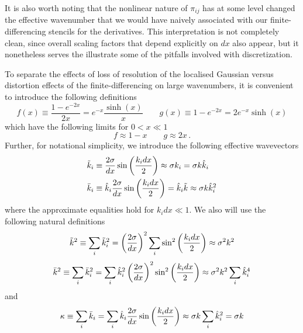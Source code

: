 \documentclass{revtex4}
\begin{document}
It is also worth noting that the nonlinear nature of $\pi_{ij}$ has at some level changed the effective wavenumber that we would have naively associated with our finite-differencing stencils for the derivatives.  This interpretation is not completely clean, since overall scaling factors that depend explicitly on $dx$ also appear, but it nonetheless serves the illustrate some of the pitfalls involved with discretization.

To separate the effects of loss of resolution of the localised Gaussian versus distortion effects of the finite-differencing on large wavenumbers, it is convenient to introduce the following definitions
\begin{equation}
  f(x) \equiv \frac{1-e^{-2x}}{2x} = e^{-x}\frac{\sinh(x)}{x} \qquad g(x) \equiv 1-e^{-2x} = 2e^{-x}\sinh(x)
\end{equation}
which have the following limits for $0 < x \ll 1$
\begin{equation}
  f \approx 1-x \qquad g \approx 2x \, .
\end{equation}
Further, for notational simplicity, we introduce the following effective wavevectors
\begin{subequations}
\begin{align}
  \tilde{k}_i &\equiv \frac{2\sigma}{dx}\sin\left(\frac{k_idx}{2}\right) \approx \sigma k_i = \sigma k \hat{k}_i \\
  \bar{k}_i &\equiv \hat{k}_i\frac{2\sigma}{dx}\sin\left(\frac{k_idx}{2}\right) = \hat{k}_i\tilde{k} \approx \sigma k\hat{k}_i^2
\end{align}
\end{subequations}
where the approximate equalities hold for $k_idx \ll 1$.
We also will use the following natural definitions
\begin{equation}
  \tilde{k}^2 \equiv \sum_i\tilde{k}_i^2 = \left(\frac{2\sigma}{dx}\right)^2\sum_i\sin^2\left(\frac{k_idx}{2}\right) \approx \sigma^2k^2
\end{equation}
\begin{equation}
  \bar{k}^2 \equiv \sum_i\bar{k}_i^2 = \sum_i \hat{k}_i^2\left(\frac{2\sigma}{dx}\right)^2\sin^2\left(\frac{k_idx}{2}\right) \approx \sigma^2k^2\sum_i\hat{k}_i^4
\end{equation}
and
\begin{equation}
  \kappa \equiv \sum_i\bar{k}_i = \sum_i\hat{k}_i\frac{2\sigma}{dx}\sin\left(\frac{k_idx}{2}\right) \approx \sigma k\sum_i\hat{k}_i^2 = \sigma k
\end{equation}
\end{document}
